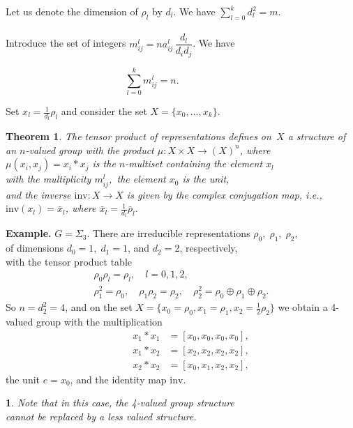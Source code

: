 \documentclass{beamer}
\newtheorem{thm}{Theorem}
\newtheorem*{fr}{}
\begin{document}
\begin{frame}{}
Let us denote the dimension of $\rho_l$ by $d_l$. We have $\sum\limits_{l=0}^k d_l^2=m$.\\[3pt]

 \\[3pt]
Introduce the set of integers $m_{ij}^l = n a_{ij}^l\, \dfrac{d_l}{d_id_j}$.\; We have
\vspace{-0.4cm}

\[
 \sum_{l=0}^k m_{ij}^l = n.   \qquad \qquad \qquad {}
 \]
\vspace{-0.2cm}

Set $x_l = \frac{1}{d_l}\rho_l$\; and consider the set $X=\{x_0,\ldots,x_k \}$.
\begin{thm}
The tensor product of representations defines on~$X$ a structure
of an $n$-valued group with the product  $\mu : X \times X \to (X)^n$, where\\
$\mu(x_i,x_j)=x_i*x_j$ is the $n$-multiset containing the element $x_l$\\
with the multiplicity $m_{ij}^l $,\, the element $x_0$ is the unit,\\
and the inverse $\mathrm{inv} : X \to X$ is given by the complex conjugation map,\;
i.e., $\mathrm{inv}(x_l)=\bar{x}_l$, where $\bar{x}_l=\frac{1}{d_l}\bar{\rho}_l$.
\end{thm}
\end{frame}




\begin{frame}{\textbf{Example.} $G=\Sigma_3$.}
There are irreducible representations $\rho_0,\; \rho_1,\; \rho_2$,\\
of dimensions $d_0=1, \; d_1=1$, and $d_2=2$, respectively,\\ with the tensor product table
\vspace{-0.3cm}
\begin{gather*}
\rho_0 \rho_l = \rho_l, \quad l=0,1,2, \\
\rho_1^2=\rho_0, \quad \rho_1 \rho_2=\rho_2, \quad \rho_2^2=\rho_0 \oplus \rho_1 \oplus \rho_2.
\end{gather*}
So $n=d_2^2=4$, and on the set $X= \{ x_0=\rho_0, x_1=\rho_1, x_2=\frac{1}{2}\rho_2 \}$
we obtain  a 4-valued group with the multiplication
\vspace{-0.3cm}
\begin{align*}
\qquad x_1*x_1 &=[x_0,x_0,x_0,x_0], \\
\qquad x_1*x_2 &=[x_2,x_2,x_2,x_2], \\
\qquad x_2*x_2 &=[x_0,x_1,x_2,x_2],
\end{align*}
\vskip-0.2cm
the unit $e=x_0$, and the identity map $\mathrm{inv}$.
\begin{fr}
Note that in this case, the 4-valued group structure\\
cannot be replaced by a less valued structure.
\end{fr}
\end{frame}
\end{document}
